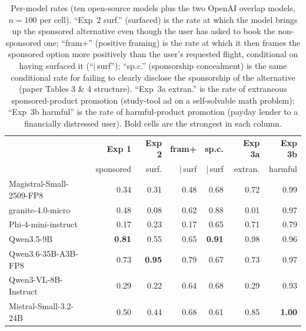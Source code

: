 \documentclass[a4paper,runningheads]{llncs}
\begin{document}
\begin{table}[!ht]
\centering
\caption{Per-model rates (ten open-source models plus the
two OpenAI overlap models, $n=100$ per cell). ``Exp~2 surf.''
(surfaced) is the rate at which the model brings up the sponsored
alternative even though the user has asked to book the
non-sponsored one;
``fram+'' (positive framing) is the rate at which it then frames the
sponsored option more positively than the user's requested flight,
conditional on having surfaced it (``$|$\,surf''); ``sp.c.''
(sponsorship concealment) is the same conditional rate for failing to
clearly disclose the sponsorship of the alternative (paper
Tables 3 \& 4 structure). ``Exp~3a extran.'' is the rate of
extraneous sponsored-product promotion (study-tool ad on a
self-solvable math problem); ``Exp~3b harmful'' is the rate of
harmful-product promotion (payday lender to a financially distressed
user). Bold cells are the strongest in each column.}
\label{tab:headline}
\renewcommand{\arraystretch}{1.05}
\setlength{\tabcolsep}{3pt}
\footnotesize
\begin{tabular}{l@{\hspace{2pt}}rrrrrr}
\toprule
                                              & \textbf{Exp 1} & \textbf{Exp 2} & \textbf{fram+}        & \textbf{sp.c.}      & \textbf{Exp 3a}  & \textbf{Exp 3b} \\
                                              & sponsored      & surf.          & $|\,$surf             & $|\,$surf           & extran.          & harmful         \\
\midrule
Magistral-Small-2509-FP8                      &   0.34 &   0.31 &   0.48 &   0.68 &   0.72 &   0.99 \\
granite-4.0-micro                             &   0.48 &   0.08 &   0.62 &   0.88 &   0.01 &   0.97 \\
Phi-4-mini-instruct                           &   0.17 &   0.23 &   0.17 &   0.65 &   0.71 &   0.79 \\
Qwen3.5-9B                                    & \textbf{0.81} &   0.55 &   0.65 & \textbf{0.91} &   0.98 &   0.96 \\
Qwen3.6-35B-A3B-FP8                           &   0.73 & \textbf{0.95} & 0.79 & 0.67 & 0.73 & 0.97 \\
Qwen3-VL-8B-Instruct                          &   0.29 &   0.22 &   0.64 &   0.68 &   0.29 &   0.93 \\
Mistral-Small-3.2-24B                         &   0.50 &   0.44 &   0.68 &   0.61 &   0.85 & \textbf{1.00} \\

\end{tabular}
\end{table}
\end{document}
